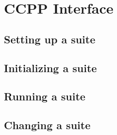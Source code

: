 \chapter{CCPP Interface}
\label{chapter: ccpp_interface}
\setlength{\parskip}{12pt}

\section{Setting up a suite}

\section{Initializing a suite}

\section{Running a suite}

\section{Changing a suite}


